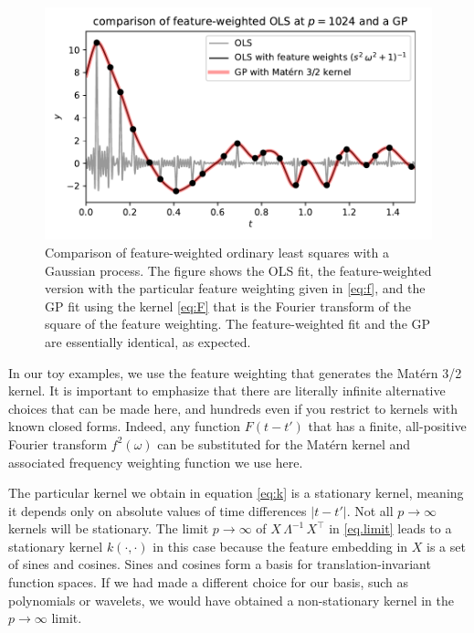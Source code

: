 \documentclass[12pt,letterpaper]{article}
\newlength{\figurewidth}
\begin{document}
\begin{figure}[t]
    \begin{mdframed}
    \includegraphics[width=\figurewidth]{./GP.pdf}
    \caption{Comparison of feature-weighted ordinary least squares with a Gaussian process. The figure shows the OLS fit, the feature-weighted version with the particular feature weighting given in \eqref{eq:f}, and the GP fit using the kernel \eqref{eq:F} that is the Fourier transform of the square of the feature weighting. The feature-weighted fit and the GP are essentially identical, as expected.}
    \label{fig:gp}
    \end{mdframed}
\end{figure}

In our toy examples, we use the feature weighting that generates the Mat\'ern 3/2 kernel.
It is important to emphasize that there are literally infinite alternative choices that can be made here, and hundreds even if you restrict to kernels with known closed forms.
Indeed, any function $F(t-t')$ that has a finite, all-positive Fourier transform $f^2(\omega)$ can be substituted for the Mat\'ern kernel and associated frequency weighting function we use here.

The particular kernel we obtain in equation \eqref{eq:k} is a stationary kernel, meaning it depends only on absolute values of time differences $|t - t'|$. Not all $p\to\infty$ kernels will be stationary. The limit $p\to\infty$ of $X\,\Lambda^{-1}\,X^\top$ in \eqref{eq.limit} leads to a stationary kernel $k(\cdot,\cdot)$ in this case because the feature embedding in $X$ is a set of sines and cosines.
Sines and cosines form a basis for translation-invariant function spaces.
If we had made a different choice for our basis, such as polynomials or wavelets, we would have obtained a non-stationary kernel in the $p\to\infty$ limit.
\end{document}
